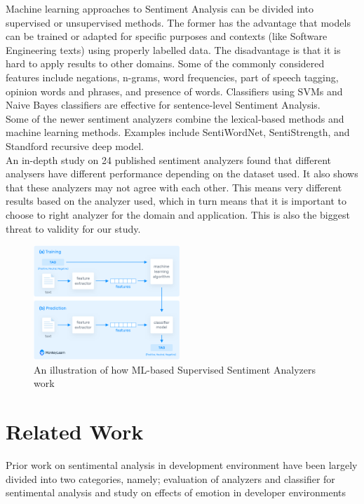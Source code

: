 \documentclass[conference]{IEEEtran}
\begin{document}
Machine learning approaches to Sentiment Analysis can be divided into supervised or unsupervised methods. The former has the advantage that models can be trained or adapted for specific purposes and contexts (like Software Engineering texts) using properly labelled data. The disadvantage is that it is hard to apply results to other domains. Some of the commonly considered features include negations, n-grams, word frequencies, part of speech tagging, opinion words and phrases, and presence of words. Classifiers using SVMs and Naive Bayes classifiers are effective for sentence-level Sentiment Analysis.\cite{b11, b13, b14}\\

Some of the newer sentiment analyzers combine the lexical-based methods and machine learning methods. Examples include SentiWordNet\cite{b15}, SentiStrength\cite{b16}, and Standford recursive deep model\cite{b17}.\\

An in-depth study on 24 published sentiment analyzers found that different analysers have different performance depending on the dataset used.\cite{b13} It also shows that these analyzers may not agree with each other. This means very different results based on the analyzer used, which in turn means that it is important to choose to right analyzer for the domain and application. This is also the biggest threat to validity for our study.\\

\begin{figure}[htbp]
\centerline{\includegraphics[width=0.49\textwidth]{figures/how-does-sentiment-analysis-work.png}}
\caption{An illustration of how ML-based Supervised Sentiment Analyzers work\cite{b32}}
\label{fig}
\end{figure}

\section{Related Work}
Prior work on sentimental analysis in development environment have been largely divided into two categories, namely; evaluation of analyzers and classifier for sentimental analysis and study on effects of emotion in developer environments\\
\end{document}
